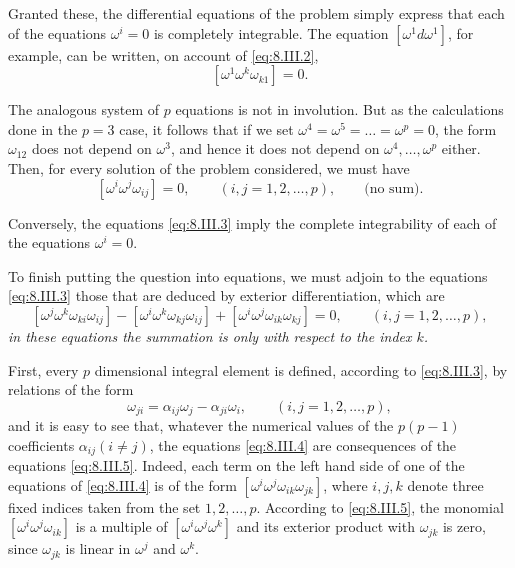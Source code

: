 \documentclass[leqno,11pt]{book}
\numberwithin{equation}{chapter}
\theoremstyle{shape1}
\theoremstyle{shape0}
\theoremstyle{shape2}
\theoremstyle{definition}
\begin{document}
\vspace{12pt}\fsec Granted these, the differential equations of the problem simply express that each of the equations $\omega^{i}=0$ is completely integrable. The equation $[\omega^{1}d\omega^{1}]$, for example, can be written, on account of \eqref{eq:8.III.2},
\[
[\omega^{1}\omega^{k}\omega_{k1}]=0.
\]

The analogous system of $p$ equations is not in involution. But as the calculations done in the $p=3$ case, it follows that if we set $\omega^{4}=\omega^{5}=\dots=\omega^{p}=0$, the form $\omega_{12}$ does not depend on $\omega^{3}$, and hence it does not depend on $\omega^{4},\dots,\omega^{p}$ either. Then, for every solution of the problem considered, we must have
\begin{equation}
  \label{eq:8.III.3}\tag{III, 3}
  [\omega^{i}\omega^{j}\omega_{ij}]=0,\qquad(i,j=1,2,\dots,p),\qquad\text{(no sum)}.
\end{equation}

Conversely, the equations \eqref{eq:8.III.3} imply the complete integrability of each of the equations $\omega^{i}=0$.

To finish putting the question into equations, we must adjoin to the equations \eqref{eq:8.III.3} those that are deduced by exterior differentiation, which are
\begin{equation}
  \label{eq:8.III.4}\tag{III, 4}
  [\omega^{j}\omega^{k}\omega_{ki}\omega_{ij}]-[\omega^{i}\omega^{k}\omega_{kj}\omega_{ij}]+[\omega^{i}\omega^{j}\omega_{ik}\omega_{kj}]=0,\qquad(i,j=1,2,\dots,p),
\end{equation}
\emph{in these equations the summation is only with respect to the index $k$.}

First, every $p$ dimensional integral element is defined, according to \eqref{eq:8.III.3}, by relations of the form
\begin{equation}
  \label{eq:8.III.5}\tag{III, 5}
  \omega_{ji}=\alpha_{ij}\omega_{j}-\alpha_{ji}\omega_{i},\qquad(i,j=1,2,\dots,p),
\end{equation}
and it is easy to see that, whatever the numerical values of the $p(p-1)$ coefficients $\alpha_{ij}(i\neq j)$, the equations \eqref{eq:8.III.4} are consequences of the equations \eqref{eq:8.III.5}. Indeed, each term on the left hand side of one of the equations of \eqref{eq:8.III.4} is of the form $[\omega^{i}\omega^{j}\omega_{ik}\omega_{jk}]$, where $i,j,k$ denote three fixed  indices taken from the set $1,2,\dots,p$. According to \eqref{eq:8.III.5}, the monomial $[\omega^{i}\omega^{j}\omega_{ik}]$ is a multiple of $[\omega^{i}\omega^{j}\omega^{k}]$ and its exterior product with $\omega_{jk}$ is zero, since $\omega_{jk}$ is linear in $\omega^{j}$ and $\omega^{k}$.
\end{document}
